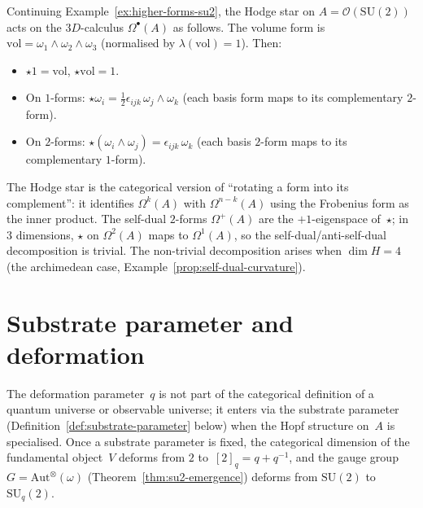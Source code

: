 \begin{example}
\label{ex:hodge-su2}
Continuing Example~\ref{ex:higher-forms-su2}, the Hodge star on
$A = \mathcal{O}(\mathrm{SU}(2))$ acts on the $3D$-calculus
$\Omega^{\bullet}(A)$ as follows.  The volume form is
$\mathrm{vol} = \omega_1 \wedge \omega_2 \wedge \omega_3$
(normalised by $\lambda(\mathrm{vol}) = 1$).  Then:
\begin{itemize}
  \item $\star 1 = \mathrm{vol}$, \;
        $\star\mathrm{vol} = 1$.
  \item On $1$-forms: $\star\omega_i = \tfrac{1}{2}\epsilon_{ijk}\,
        \omega_j \wedge \omega_k$ (each basis form maps to its
        complementary $2$-form).
  \item On $2$-forms: $\star(\omega_i \wedge \omega_j) =
        \epsilon_{ijk}\,\omega_k$ (each basis $2$-form maps to its
        complementary $1$-form).
\end{itemize}
The Hodge star is the categorical version of ``rotating a form into
its complement'': it identifies $\Omega^k(A)$ with $\Omega^{n-k}(A)$
using the Frobenius form as the inner product.  The self-dual
$2$-forms $\Omega^+(A)$ are the $+1$-eigenspace of~$\star$; in
$3$ dimensions, $\star$ on $\Omega^2(A)$ maps to $\Omega^1(A)$, so
the self-dual/anti-self-dual decomposition is trivial.  The
non-trivial decomposition arises when $\dim H = 4$ (the archimedean
case, Example~\ref{prop:self-dual-curvature}).
\end{example}


\section{Substrate parameter and deformation}
\label{sec:substrate-parameter}

\begin{remark}
\label{rem:quantum-universe-explication}
The deformation parameter~$q$ is not part of the categorical
definition of a quantum universe or observable universe; it enters via
the substrate parameter
(Definition~\ref{def:substrate-parameter} below) when the Hopf structure
on~$A$ is specialised.  Once a substrate parameter is fixed, the
categorical dimension of the fundamental object~$V$ deforms from $2$
to~$[2]_q = q + q^{-1}$, and the gauge group
$G = \mathrm{Aut}^{\otimes}(\omega)$
(Theorem~\ref{thm:su2-emergence}) deforms from $\mathrm{SU}(2)$
to~$\mathrm{SU}_q(2)$.
\end{remark}

